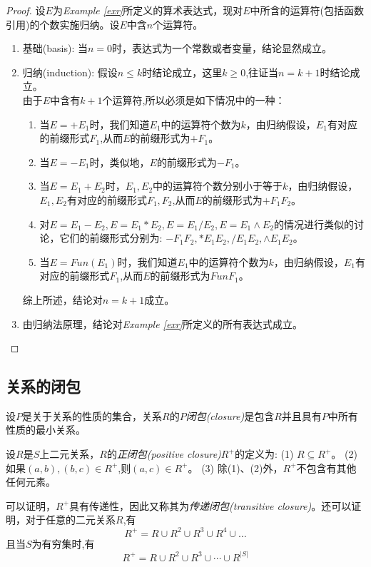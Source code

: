 \begin{proof}
	设$E$为\textit{Example \ref{exr}}所定义的算术表达式，现对$E$中所含的运算符(包括函数引用)的个数实施归纳。设$E$中含$n$个运算符。
	\begin{enumerate}
		\item 基础(basis): 当$n=0$时，表达式为一个常数或者变量，结论显然成立。
		\item 归纳(induction): 假设$n\le k$时结论成立，这里$k\ge 0$,往证当$n=k+1$时结论成立。\\
		由于$E$中含有$k+1$个运算符,所以必须是如下情况中的一种：
		\begin{enumerate}
			\item 当$E=+E_1$时，我们知道$E_1$中的运算符个数为$k$，由归纳假设，$E_1$有对应的前缀形式$F_1$,从而$E$的前缀形式为$+F_1$。
			\item 当$E=-E_1$时，类似地，$E$的前缀形式为$-F_1$。
			\item 当$E=E_1+E_2$时，$E_1,E_2$中的运算符个数分别小于等于$k$，由归纳假设，$E_1,E_2$有对应的前缀形式$F_1,F_2$,从而$E$的前缀形式为$+F_1F_2$。
			\item 对$E=E_1-E_2,E=E_1\ast E_2,E=E_1/E_2,E=E_1\land E_2 $的情况进行类似的讨论，它们的前缀形式分别为: $-F_1F_2,\ast E_1E_2,/E_1E_2,\land E_1E_2$。
			\item 当$E=Fun(E_1)$时，我们知道$E_1$中的运算符个数为$k$，由归纳假设，$E_1$有对应的前缀形式$F_1$,从而$E$的前缀形式为$FunF_1$。
		\end{enumerate}
	    综上所述，结论对$n=k+1$成立。
	    \item 由归纳法原理，结论对\textit{Example \ref{exr}}所定义的所有表达式成立。
	\end{enumerate}
\end{proof}

\subsection{关系的闭包}

\begin{definition}
	设$P$是关于关系的性质的集合，关系$R$的\emph{$P$闭包(closure)}是包含$R$并且具有$P$中所有性质的最小关系。
\end{definition}

\begin{definition}\label{def:R+}
	设$R$是$S$上二元关系，$R$的\emph{正闭包(positive closure)}$R^+$的定义为:
	\subitem(1) $R\subseteq R^{+}$。
	\subitem(2) 如果$(a,b),(b,c) \in R^{+}$,则$(a,c)\in R^{+}$。
	\subitem(3) 除(1)、(2)外，$R^{+}$不包含有其他任何元素。 
    
    可以证明，$R^+$具有传递性，因此又称其为\emph{传递闭包(transitive closure)}。还可以证明，对于任意的二元关系$R$,有
    $$R^{+} = R\cup R^2 \cup R^3 \cup R^4 \cup \dots$$
    且当$S$为有穷集时,有
    \[R^{+} = R\cup R^2 \cup R^3 \cup \cdots \cup R^{|S|} \]
\end{definition}

